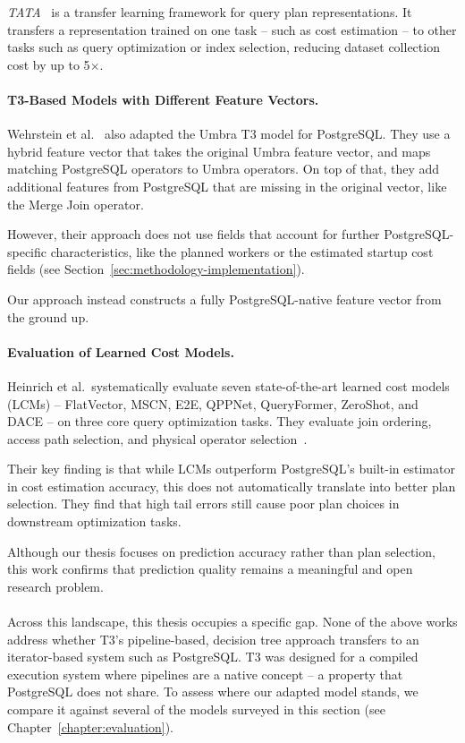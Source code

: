 \textit{TATA}~\parencite{tata} is a transfer learning framework for query plan representations.
It transfers a representation trained on one task -- such as cost estimation -- to other tasks such as query optimization or index selection, reducing dataset collection cost by up to 5$\times$.

\paragraph{T3-Based Models with Different Feature Vectors.}
Wehrstein et al.~\parencite{jobcomplex} also adapted the Umbra T3 model for PostgreSQL.
They use a hybrid feature vector that takes the original Umbra feature vector, and maps matching PostgreSQL operators to Umbra operators.
On top of that, they add additional features from PostgreSQL that are missing in the original vector, like the Merge Join operator.

However, their approach does not use fields that account for further PostgreSQL-specific characteristics, like the planned workers or the estimated startup cost fields (see Section~\ref{sec:methodology-implementation}).

Our approach instead constructs a fully PostgreSQL-native feature vector from the ground up.

\paragraph{Evaluation of Learned Cost Models.}
Heinrich et al.\ systematically evaluate seven state-of-the-art learned cost models (LCMs) -- FlatVector, MSCN, E2E, QPPNet, QueryFormer, ZeroShot, and DACE -- on three core query optimization tasks.
They evaluate join ordering, access path selection, and physical operator selection~\parencite{howgoodlcm}.

Their key finding is that while LCMs outperform PostgreSQL's built-in estimator in cost estimation accuracy, this does not automatically translate into better plan selection.
They find that high tail errors still cause poor plan choices in downstream optimization tasks.

Although our thesis focuses on prediction accuracy rather than plan selection, this work confirms that prediction quality remains a meaningful and open research problem.

\paragraph{}
Across this landscape, this thesis occupies a specific gap.
None of the above works address whether T3's pipeline-based, decision tree approach transfers to an iterator-based system such as PostgreSQL.
T3 was designed for a compiled execution system where pipelines are a native concept -- a property that PostgreSQL does not share.
To assess where our adapted model stands, we compare it against several of the models surveyed in this section (see Chapter~\ref{chapter:evaluation}).

